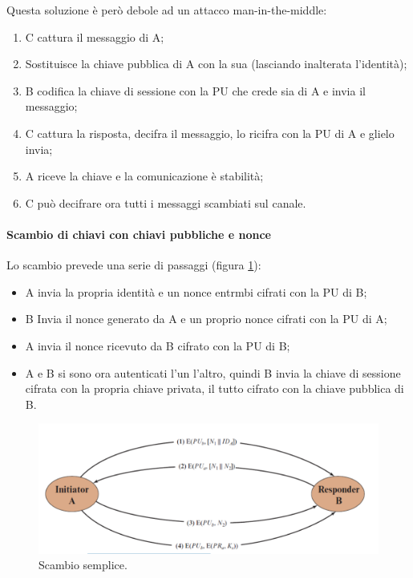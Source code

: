 Questa soluzione è però debole ad un attacco man-in-the-middle: 
\begin{enumerate}
    \item C cattura il messaggio di A; 
	\item Sostituisce la chiave pubblica di A con la sua (lasciando inalterata l'identità);
	\item B codifica la chiave di sessione con la PU che crede sia di A e invia il messaggio;
	\item C cattura la risposta, decifra il messaggio, lo ricifra con la PU di A e glielo invia;
	\item A riceve la chiave e la comunicazione è stabilità;
	\item C può decifrare ora tutti i messaggi scambiati sul canale.
\end{enumerate}

\paragraph{Scambio di chiavi con chiavi pubbliche e nonce} Lo scambio prevede una serie di passaggi (figura \ref{fig:3-3}):
\begin{itemize}
    \item A invia la propria identità e un nonce entrmbi cifrati con la PU di B; 
    \item B Invia il nonce generato da A e un proprio nonce cifrati con la PU di A;
    \item A invia il nonce ricevuto da B cifrato con la PU di B;
    \item A e B si sono ora autenticati l'un l'altro, quindi B invia la chiave di sessione cifrata con la propria chiave privata, il tutto cifrato con la chiave pubblica di B.
\end{itemize}

\begin{figure}
    \centering
    \includegraphics[width=1\textwidth]{images/chapter3/3-3.png}
    \caption{Scambio semplice.}
    \label{fig:3-3}
\end{figure}

